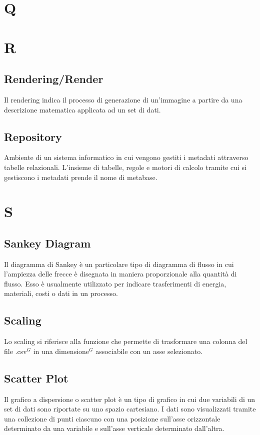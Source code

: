 \section{Q}

\newpage
\section{R}

\subsection{Rendering/Render}
Il rendering indica il processo di generazione di un'immagine a partire da una descrizione matematica applicata ad un set di dati.

\subsection{Repository}
Ambiente di un sistema informatico in cui vengono gestiti i metadati attraverso tabelle relazionali.
L’insieme di tabelle, regole e motori di calcolo tramite cui si gestiscono i metadati prende il nome di
metabase.

\newpage
\section{S}
\subsection{Sankey Diagram}
Il diagramma di Sankey è un particolare tipo di diagramma di flusso in cui l'ampiezza delle frecce è disegnata in maniera proporzionale alla quantità di flusso.
Esso è usualmente utilizzato per indicare trasferimenti di energia, materiali, costi o dati in un processo.

\subsection{Scaling}
Lo scaling si riferisce alla funzione che permette di trasformare una colonna del file .csv$^{G}$ in una dimensione$^{G}$ associabile con un asse selezionato.

\subsection{Scatter Plot}
Il grafico a dispersione o scatter plot è un tipo di grafico in cui due variabili di un set di dati sono riportate su uno spazio cartesiano.
I dati sono visualizzati tramite una collezione di punti ciascuno con una posizione sull'asse orizzontale determinato da una variabile e sull'asse verticale determinato dall'altra. 

